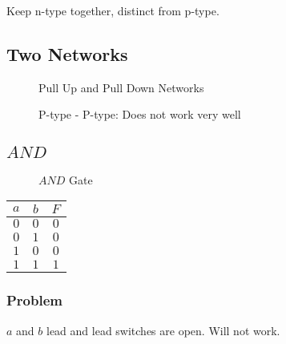 \documentclass[a4paper,12pt]{article}
\begin{document}
Keep n-type together, distinct from p-type.


\subsection*{Two Networks}

\begin{figure}[hbtp]


\caption{Pull Up and Pull Down Networks}

\end{figure}

\begin{figure}[hbtp]


\caption{P-type - P-type: Does not work very well}

\end{figure}

\subsection*{$AND$}

\begin{figure}[hbt] 
\centering 



\caption{$AND$ Gate}

\label{AND Gate} 

\end{figure} 


\begin{tabular}{cc|c}
$a$	&	$b$	&	$F$	\\
\hline
$0$	&	$0$	&	$0$	\\
$0$	&	$1$	&	$0$	\\
$1$	&	$0$	&	$0$	\\
$1$	&	$1$	&	$1$	
\end{tabular}

\begin{figure}[hbtp]


\end{figure}

\subsubsection*{Problem}

$a$ and $b$ lead and lead switches are open. Will not work.
\end{document}
